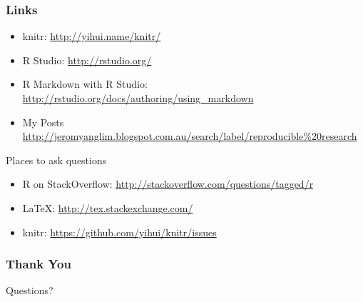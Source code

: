 \begin{frame}[fragile]\frametitle{Links}

\begin{itemize}
\item
  knitr: \url{http://yihui.name/knitr/}
\item
  R Studio: \url{http://rstudio.org/}
\item
  R Markdown with R Studio:
  \url{http://rstudio.org/docs/authoring/using_markdown}
\item
  My Posts
  \url{http://jeromyanglim.blogspot.com.au/search/label/reproducible%20research}
\end{itemize}

\begin{block}{Places to ask questions}

\begin{itemize}
\item
  R on StackOverflow: \url{http://stackoverflow.com/questions/tagged/r}
\item
  LaTeX: \url{http://tex.stackexchange.com/}
\item
  knitr: \url{https://github.com/yihui/knitr/issues}
\end{itemize}

\end{block}

\end{frame}

\begin{frame}\frametitle{Thank You}

\begin{center}
\LARGE{Questions?}
\end{center}

\end{frame}
